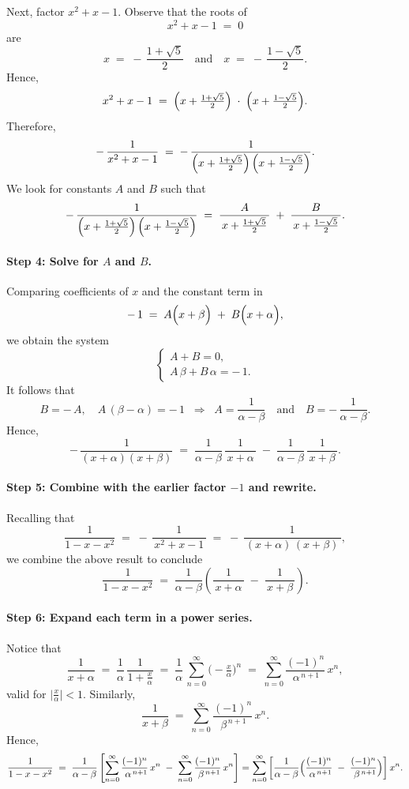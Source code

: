 \documentclass{article}
\begin{document}
\noindent
Next, factor \(x^2 + x - 1\). Observe that the roots of
\[
x^2 + x - 1 \;=\; 0
\]
are
\[
x \;=\; -\,\frac{1 + \sqrt{5}}{2}
\quad\text{and}\quad
x \;=\; -\,\frac{1 - \sqrt{5}}{2}.
\]
Hence,
\[
x^2 + x - 1
\;=\;
\Bigl(x + \tfrac{1 + \sqrt{5}}{2}\Bigr)
\;\cdot\;
\Bigl(x + \tfrac{1 - \sqrt{5}}{2}\Bigr).
\]
Therefore,
\[
-\,\frac{1}{x^2 + x - 1}
\;=\;
-\,\frac{1}{\Bigl(x + \tfrac{1 + \sqrt{5}}{2}\Bigr)\,\Bigl(x + \tfrac{1 - \sqrt{5}}{2}\Bigr)}.
\]
We look for constants \(A\) and \(B\) such that
\[
-\,\frac{1}{\Bigl(x + \tfrac{1 + \sqrt{5}}{2}\Bigr)\,\Bigl(x + \tfrac{1 - \sqrt{5}}{2}\Bigr)}
\;=\;
\frac{A}{\,x + \tfrac{1 + \sqrt{5}}{2}\,}
\;+\;
\frac{B}{\,x + \tfrac{1 - \sqrt{5}}{2}\,}.
\]


\paragraph{Step 4: Solve for \(A\) and \(B\).}

Comparing coefficients of \(x\) and the constant term in
\[
-\,1
\;=\;
A\Bigl(x + \beta\Bigr)
\;+\;
B\Bigl(x + \alpha\Bigr),
\]
we obtain the system
\[
\begin{cases}
A + B = 0, \\[4pt]
A\,\beta + B\,\alpha = -\,1.
\end{cases}
\]
It follows that
\[
B = -\,A,
\quad
A\,(\beta - \alpha) = -\,1
\;\;\Longrightarrow\;\;
A = \frac{1}{\alpha - \beta}
\quad\text{and}\quad
B = -\,\frac{1}{\alpha - \beta}.
\]
Hence,
\[
-\,\frac{1}{(x+\alpha)(x+\beta)}
\;=\;
\frac{1}{\alpha - \beta}\,\frac{1}{\,x+\alpha\,}
\;-\;
\frac{1}{\alpha - \beta}\,\frac{1}{\,x+\beta\,}.
\]

\paragraph{Step 5: Combine with the earlier factor \(-1\) and rewrite.}

Recalling that
\[
\frac{1}{1 - x - x^2}
\;=\;
-\,\frac{1}{\,x^2 + x - 1\,}
\;=\;
-\,\frac{1}{\,(x+\alpha)\,(x+\beta)\,},
\]
we combine the above result to conclude
\[
\frac{1}{1 - x - x^2}
\;=\;
\frac{1}{\alpha - \beta}
\left(
\frac{1}{\,x+\alpha\,}
\;-\;
\frac{1}{\,x+\beta\,}
\right).
\]

\paragraph{Step 6: Expand each term in a power series.}

Notice that
\[
\frac{1}{x + \alpha}
\;=\;
\frac{1}{\alpha}\,\frac{1}{1 + \tfrac{x}{\alpha}}
\;=\;
\frac{1}{\alpha}\,\sum_{n=0}^\infty \bigl(-\tfrac{x}{\alpha}\bigr)^{n}
\;=\;
\sum_{n=0}^\infty
\frac{(-1)^n}{\,\alpha^{\,n+1}\!}\,
x^n,
\]
valid for \(\bigl|\tfrac{x}{\alpha}\bigr| < 1\).  Similarly,
\[
\frac{1}{x + \beta}
\;=\;
\sum_{n=0}^\infty
\frac{(-1)^n}{\,\beta^{\,n+1}\!}\,
x^n.
\]
Hence,
\[
\frac{1}{1 - x - x^2}
\;=\;
\frac{1}{\alpha - \beta}
\left[
\sum_{n=0}^\infty \frac{(-1)^n}{\,\alpha^{\,n+1}\!}\,x^n
\;-\;
\sum_{n=0}^\infty \frac{(-1)^n}{\,\beta^{\,n+1}\!}\,x^n
\right]
=
\sum_{n=0}^\infty
\left[
\frac{1}{\alpha - \beta}
\Bigl(
\frac{(-1)^n}{\,\alpha^{\,n+1}\!}
\;-\;
\frac{(-1)^n}{\,\beta^{\,n+1}\!}
\Bigr)
\right]
x^n.
\]
\end{document}
